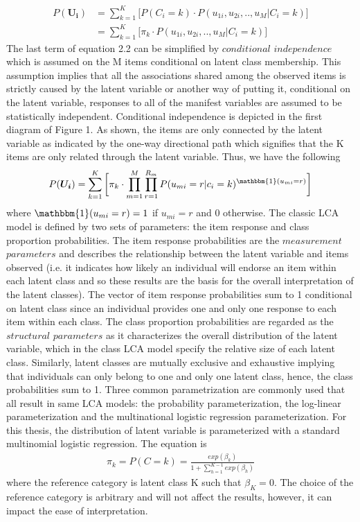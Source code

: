 \begin{align}
P(\bm{U_{i}}) &= \sum_{k=1}^{K} \bigg[ P(C_{i}=k) \cdot P(u_{1i},u_{2i},..,u_{M}|C_{i}=k)\bigg] \\
&=\sum_{k=1}^{K} \bigg[ \pi_{k} \cdot P(u_{1i},u_{2i},..,u_{M}|C_{i}=k)\bigg]
\end{align}
The last term of equation 2.2 can be simplified by $conditional$ $independence$ which is assumed on the M items conditional on latent class membership. This assumption implies that all the associations shared among the observed items is strictly caused by the latent variable or another way of putting it, conditional on the latent variable, responses to all of the manifest variables are assumed to be statistically independent. Conditional independence is depicted in the first diagram of Figure 1. As shown, the items are only connected by the latent variable as indicated by the one-way directional path which signifies that the K items are only related through the latent variable. Thus, we have the following 
\begin{align}
P(\bm{U_{i}}) = \sum_{k=1}^{K} \bigg[ \pi_{k} \cdot  \prod_{m=1}^{M}\prod_{r=1}^{R_{m}} P(u_{mi}=r|c_{i}=k)^{\mathbbm{1}(u_{mi} = r)} \bigg ]
\end{align}
where $\mathbbm{1}(u_{mi} = r)=1$ if $u_{mi}=r$ and $0$ otherwise. The classic LCA model is defined by two sets of parameters: the item response and class proportion probabilities. The item response probabilities are the $measurement$ $parameters$ and describes the relationship between the latent variable and items observed (i.e. it indicates how likely an individual will endorse an item within each latent class and so these results are the basis for the overall interpretation of the latent classes). The vector of item response probabilities sum to 1 conditional on latent class since an individual provides one and only one response to each item within each class. The class proportion probabilities are regarded as the $structural$ $parameters$ as it characterizes the overall distribution of the latent variable, which in the class LCA model specify the relative size of each latent class. Similarly, latent classes are mutually exclusive and exhaustive implying that individuals can only belong to one and only one latent class, hence, the class probabilities sum to 1. Three common parametrization are commonly used that all result in same LCA models: the probability parameterization, the log-linear parameterization and the multinational logistic regression parameterization. For this thesis, the distribution of latent variable is parameterized with a standard multinomial logistic regression. The equation is
\begin{align}
    \pi_{k} = P(C=k) = \frac{exp(\beta_{k})}{1 + \sum_{h=1}^{K-1}exp(\beta_{h})}
\end{align} where the reference category is latent class K such that $\beta_{K}=0$. The choice of the reference category is arbitrary and will not affect the results, however, it can impact the ease of interpretation.

